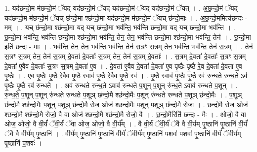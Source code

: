 \documentclass[17pt]{extarticle}
\begin{document}
1. यद॑छन्दो॒म म॑छन्दो॒मं ॅयद् यद॑छन्दो॒मं ॅयद् यद॑छन्दो॒मं ॅयद् यद॑छन्दो॒मं ॅयत् । . अ॒छ॒न्दो॒मं ॅयद् यद॑छन्दो॒म म॑छन्दो॒मं ॅयच् छ॑न्दो॒मा श्छ॑न्दो॒मा यद॑छन्दो॒म म॑छन्दो॒मं ॅयच् छ॑न्दो॒माः । . अ॒छ॒न्दो॒ममित्य॑छन्दः - मम् । . यच् छ॑न्दो॒मा श्छ॑न्दो॒मा यद् यच् छ॑न्दो॒मा भव॑न्ति॒ भव॑न्ति छन्दो॒मा यद् यच् छ॑न्दो॒मा भव॑न्ति । . छ॒न्दो॒मा भव॑न्ति॒ भव॑न्ति छन्दो॒मा श्छ॑न्दो॒मा भव॑न्ति॒ तेन॒ तेन॒ भव॑न्ति छन्दो॒मा श्छ॑न्दो॒मा भव॑न्ति॒ तेन॑ । . छ॒न्दो॒मा इति॑ छन्दः - माः । . भव॑न्ति॒ तेन॒ तेन॒ भव॑न्ति॒ भव॑न्ति॒ तेन॑ स॒त्रꣳ स॒त्रम् तेन॒ भव॑न्ति॒ भव॑न्ति॒ तेन॑ स॒त्रम् । . तेन॑ स॒त्रꣳ स॒त्रम् तेन॒ तेन॑ स॒त्रम् दे॒वता॑ दे॒वताः᳚ स॒त्रम् तेन॒ तेन॑ स॒त्रम् दे॒वताः᳚ । . स॒त्रम् दे॒वता॑ दे॒वताः᳚ स॒त्रꣳ स॒त्रम् दे॒वता॑ ए॒वैव दे॒वताः᳚ स॒त्रꣳ स॒त्रम् दे॒वता॑ ए॒व । . दे॒वता॑ ए॒वैव दे॒वता॑ दे॒वता॑ ए॒व पृ॒ष्ठैः पृ॒ष्ठै रे॒व दे॒वता॑ दे॒वता॑ ए॒व पृ॒ष्ठैः । . ए॒व पृ॒ष्ठैः पृ॒ष्ठै रे॒वैव पृ॒ष्ठै रवाव॑ पृ॒ष्ठै रे॒वैव पृ॒ष्ठै रव॑ । . पृ॒ष्ठै रवाव॑ पृ॒ष्ठैः पृ॒ष्ठै रव॑ रुन्धते रुन्ध॒ते ऽव॑ पृ॒ष्ठैः पृ॒ष्ठै रव॑ रुन्धते । . अव॑ रुन्धते रुन्ध॒ते ऽवाव॑ रुन्धते प॒शून् प॒शून् रु॑न्ध॒ते ऽवाव॑ रुन्धते प॒शून् । . रु॒न्ध॒ते॒ प॒शून् प॒शून् रु॑न्धते रुन्धते प॒शूञ् छ॑न्दो॒मै श्छ॑न्दो॒मैः प॒शून् रु॑न्धते रुन्धते प॒शूञ् छ॑न्दो॒मैः । . प॒शूञ् छ॑न्दो॒मै श्छ॑न्दो॒मैः प॒शून् प॒शूञ् छ॑न्दो॒मै रोज॒ ओज॑ श्छन्दो॒मैः प॒शून् प॒शूञ् छ॑न्दो॒मै रोजः॑ । . छ॒न्दो॒मै रोज॒ ओज॑ श्छन्दो॒मै श्छ॑न्दो॒मै रोजो॒ वै वा ओज॑ श्छन्दो॒मै श्छ॑न्दो॒मै रोजो॒ वै । . छ॒न्दो॒मैरिति॑ छन्दः - मैः । . ओजो॒ वै वा ओज॒ ओजो॒ वै वी॒र्यं॑ ॅवी॒र्यं॑ ॅवा ओज॒ ओजो॒ वै वी॒र्य᳚म् । . वै वी॒र्यं॑ ॅवी॒र्यं॑ ॅवै वै वी॒र्य॑म् पृ॒ष्ठानि॑ पृ॒ष्ठानि॑ वी॒र्यं॑ ॅवै वै वी॒र्य॑म् पृ॒ष्ठानि॑ । . वी॒र्य॑म् पृ॒ष्ठानि॑ पृ॒ष्ठानि॑ वी॒र्यं॑ ॅवी॒र्य॑म् पृ॒ष्ठानि॑ प॒शवः॑ प॒शवः॑ पृ॒ष्ठानि॑ वी॒र्यं॑ ॅवी॒र्य॑म् पृ॒ष्ठानि॑ प॒शवः॑ । \newline
\end{document}
